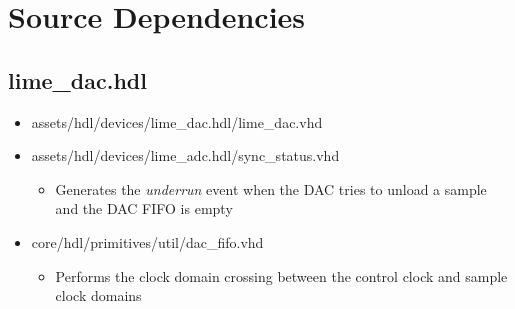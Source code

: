 \documentclass{article}
\def\comp{lime\_dac}
\begin{document}
\section*{Source Dependencies}
\subsection*{\comp.hdl}
\begin{itemize}
	\item assets/hdl/devices/lime\_dac.hdl/lime\_dac.vhd
	\item assets/hdl/devices/lime\_adc.hdl/sync\_status.vhd
	      \begin{itemize}
	      	\item Generates the \textit{underrun} event when the DAC tries to unload a sample and the DAC FIFO is empty
	      \end{itemize}
	\item core/hdl/primitives/util/dac\_fifo.vhd
	      \begin{itemize}
	      	\item Performs the clock domain crossing between the control clock and sample clock domains
	      \end{itemize}
\end{itemize}
\end{document}
